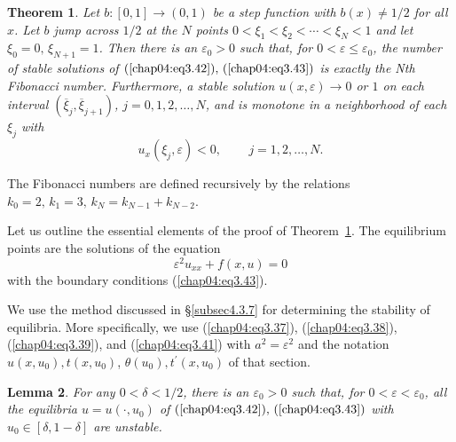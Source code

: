 \documentclass{surv-l}
\theoremstyle{plain}
\newtheorem{theorem}{Theorem}[section]
\newtheorem{lemma}[theorem]{Lemma}
\theoremstyle{definition}
\numberwithin{equation}{section}
\numberwithin{figure}{chapter}
\begin{document}
\begin{theorem}\label{thm4.3.15} Let $b\!:[0,1]\rightarrow(0,1)$ be a step function with $b(x)\neq 1/2$
for all $x$. Let $b$ jump across $1/2$ at the $N$ points $0<\xi_{1}<\xi_{2}< \cdots<\xi_{N}<1$ and let $\xi_{0}=0,\,\xi_{N+1}=1$. Then there is an $\varepsilon_{0}>0$ such that, for $ 0<\varepsilon \leq\varepsilon_{0}$, the number of stable solutions of $(\ref{chap04:eq3.42}),\, (\ref{chap04:eq3.43})$ is exactly the Nth Fibonacci number. Furthermore, a stable solution $u(x,\varepsilon)\rightarrow 0$ or $1$ on each interval $(\overline{\xi}_{j},\overline{\xi}_{j+1})$, $j=0,1,2,\ldots,N$, and is monotone in a neighborhood of each $\xi_{j}$ with
\begin{equation*}
[b(\xi_{j}^{+})-b(\xi_{j}^{-})]u_{x}(\xi_{j},\varepsilon)<0,\qquad\, j=1,2,\ldots,N.
\end{equation*}
\end{theorem}
The Fibonacci numbers are defined recursively by the relations $k_{0}=2,\,k_{1}=3,\,k_{N}=k_{N-1}+k_{N-2}$.

Let us outline the essential elements of the proof of Theorem~\ref{thm4.3.15}. The equilibrium points are the solutions of the equation
\begin{equation}\label{chap04:eq3.45}
\varepsilon^{2}u_{xx}+f(x,u)=0
\end{equation}
with the boundary conditions (\ref{chap04:eq3.43}).

We use the method discussed in \S\ref{subsec4.3.7} for determining the stability of equilibria. More specifically, we use (\ref{chap04:eq3.37}), (\ref{chap04:eq3.38}), (\ref{chap04:eq3.39}), and (\ref{chap04:eq3.41}) with $a^{2}=\varepsilon^{2}$ and the notation $u(x,u_{0}),t(x,u_{0})$, $\theta(u_{0}),t^{\prime}(x,u_{0})$ of that section.

\begin{lemma}\label{lem4.3.16} For any $0<\delta<1/2$, there is an $\varepsilon_{0}>0$ such that, for $ 0<\varepsilon <\varepsilon_{0}$, all the equilibria $u=u(\cdot,u_{0})$ of $(\ref{chap04:eq3.42}),\, (\ref{chap04:eq3.43})$ with $u_{0}\in[\delta, 1-\delta]$ are unstable.
\end{lemma}
\end{document}
